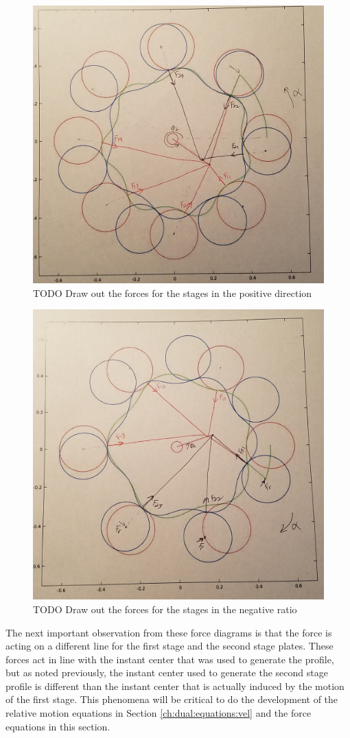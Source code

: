 \begin{figure}[h]
	\centering
	\includegraphics[width=0.50\linewidth]{fig/two_stage_force_pos_TODO}
   \caption{TODO Draw out the forces for the stages in the positive direction}
   \label{fig:two_stage_force_pos}
\end{figure}

\begin{figure}[h]
	\centering
	\includegraphics[width=0.50\linewidth]{fig/two_stage_force_neg_TODO}
   \caption{TODO Draw out the forces for the stages in the negative ratio}
   \label{fig:two_stage_force_neg}
\end{figure}

The next important observation from these force diagrams is that the force is acting on a different line for the first stage and the second stage plates. These forces act in line with the instant center that was used to generate the profile, but as noted previously, the instant center used to generate the second stage profile is different than the instant center that is actually induced by the motion of the first stage. This phenomena will be critical to do the development of the relative motion equations in Section \ref{ch:dual:equations:vel} and the force equations in this section. 

